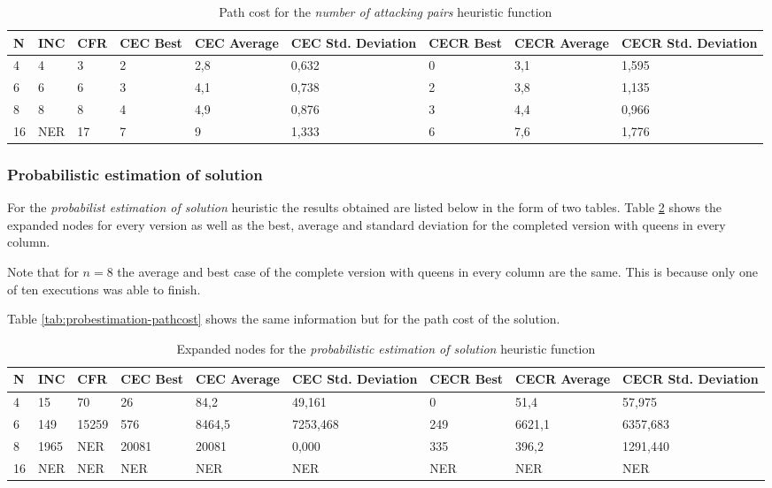 \documentclass[]{llncs}
\begin{document}
\begin{table}[H]
    \caption{Path cost for the \textit{number of attacking pairs} heuristic function}
    \centering
    \resizebox{1 \textwidth}{!} { %
        \begin{tabular}{|l|l|l|l|l|l|l|l|l|}
            \hline
            N & INC & CFR & CEC Best & CEC Average & CEC Std. Deviation & CECR Best & CECR Average & CECR Std. Deviation \\ \hline
            4 & 4 & 3 & 2 & 2,8 & 0,632 & 0 & 3,1 &	1,595 \\
            6 & 6 & 6 & 3 & 4,1 & 0,738 & 2 & 3,8 & 1,135 \\
            8 & 8 & 8 & 4 & 4,9 & 0,876 & 3	& 4,4 &	0,966 \\
            16 & NER & 17 & 7 & 9 & 1,333 & 6 & 7,6 & 1,776 \\ \hline
        \end{tabular}
        } %
        \label{tab:nattackingpairs-pathcost}
\end{table}
\subsubsection{Probabilistic estimation of solution}
For the \textit{probabilist estimation of solution} heuristic the results obtained are listed below in the form of two tables. Table \ref{tab:probestimation-expanded} shows the expanded nodes for every version as well as the best, average and standard deviation for the completed version with queens in every column. 

Note that for $n = 8$ the average and best case of the complete version with queens in every column are the same. This is because only one of ten executions was able to finish. 

Table \ref{tab:probestimation-pathcost} shows the same information but for the path cost of the solution.

\begin{table}[H]
    \caption{Expanded nodes for the \textit{probabilistic estimation of solution} heuristic function}
    \centering
    \resizebox{1 \textwidth}{!} { %
        \begin{tabular}{|l|l|l|l|l|l|l|l|l|}
            \hline
            N & INC & CFR & CEC Best & CEC Average & CEC Std. Deviation & CECR Best & CECR Average & CECR Std. Deviation \\ \hline
            4 & 15 & 70 & 26 & 84,2 & 49,161 & 0 & 51,4 & 57,975 \\
            6 & 149 & 15259 & 576 & 8464,5 & 7253,468 & 249 & 6621,1 & 6357,683 \\
            8 & 1965 & NER & 20081 & 20081 & 0,000 & 335 & 396,2 & 1291,440 \\
            16 & NER & NER & NER & NER & NER & NER & NER & NER \\ \hline         
        \end{tabular}
        } %
        \label{tab:probestimation-expanded}
\end{table}
\end{document}
